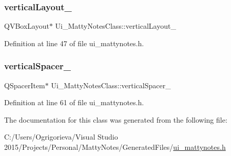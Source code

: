\hypertarget{classUi__MattyNotesClass_acc25665c3a621df2d59fcc3586cc4f16}{}\label{classUi__MattyNotesClass_acc25665c3a621df2d59fcc3586cc4f16} 
\subsubsection{\texorpdfstring{vertical\+Layout\+\_}{verticalLayout\_5}}
{\footnotesize\ttfamily Q\+V\+Box\+Layout$\ast$ Ui\+\_\+\+Matty\+Notes\+Class\+::vertical\+Layout\+\_}



Definition at line 47 of file ui\+\_\+mattynotes.\+h.

\hypertarget{classUi__MattyNotesClass_a51e58a329011bb7ae0564f78fb22ad97}{}\label{classUi__MattyNotesClass_a51e58a329011bb7ae0564f78fb22ad97} 
\subsubsection{\texorpdfstring{vertical\+Spacer\+\_}{verticalSpacer\_3}}
{\footnotesize\ttfamily Q\+Spacer\+Item$\ast$ Ui\+\_\+\+Matty\+Notes\+Class\+::vertical\+Spacer\+\_}



Definition at line 61 of file ui\+\_\+mattynotes.\+h.



The documentation for this class was generated from the following file\+:\begin{DoxyCompactItemize}
\item 
C\+:/\+Users/\+Ogrigorieva/\+Visual Studio 2015/\+Projects/\+Personal/\+Matty\+Notes/\+Generated\+Files/\hyperlink{ui__mattynotes_8h}{ui\+\_\+mattynotes.\+h}\end{DoxyCompactItemize}

